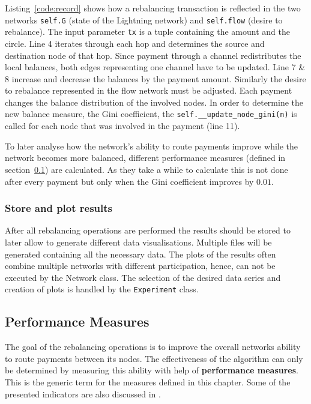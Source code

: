 \documentclass[final]{fhnwreport}       %
\begin{document}
Listing~\ref{code:record} shows how a rebalancing transaction is reflected in the two networks \texttt{self.G} (state of the Lightning network) and \texttt{self.flow} (desire to rebalance). The input parameter \texttt{tx} is a tuple containing the amount and the circle. Line 4 iterates through each hop and determines the source and destination node of that hop. Since payment through a channel redistributes the local balances, both edges representing one channel have to be updated. Line 7 \& 8 increase and decrease the balances by the payment amount. Similarly the desire to rebalance represented in the flow network must be adjusted. Each payment changes the balance distribution of the involved nodes. In order to determine the new balance measure, the Gini coefficient, the \texttt{self.__update_node_gini(n)} is called for each node that was involved in the payment (line 11).

To later analyse how the network's ability to route payments improve while the network becomes more balanced, different performance measures (defined in section~\ref{sub:perfm}) are calculated. As they take a while to calculate this is not done after every payment but only when the Gini coefficient improves by $0.01$.

\subsubsection{Store and plot results}
After all rebalancing operations are performed the results should be stored to later allow to generate different data visualisations. Multiple files will be generated containing all the necessary data. The plots of the results often combine multiple networks with different participation, hence, can not be executed by the Network class. The selection of the desired data series and creation of plots is handled by the \texttt{Experiment} class.

\subsection{Performance Measures}\label{sub:perfm}
The goal of the rebalancing operations is to improve the overall networks ability to route payments between its nodes. The effectiveness of the algorithm can only be determined by measuring this ability with help of \textbf{performance measures}. This is the generic term for the measures defined in this chapter. Some of the presented indicators are also discussed in \cite{pickhardt_evaluating_2020}. 
\end{document}
